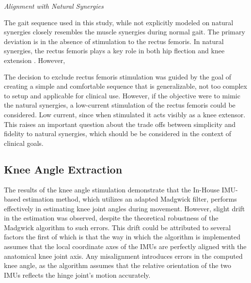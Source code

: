 \textit{Alignment with Natural Synergies}

The gait sequence used in this study, while not explicitly modeled on natural synergies closely resembles the muscle synergies during normal gait. The primary deviation is in the absence of stimulation to the rectus femoris. In natural synergies, the rectus femoris plays a key role in both hip flection and knee extension . However, 

The decision to exclude rectus femoris stimulation was guided by the goal of creating a simple and comfortable sequence that is generalizable, not too complex to setup and applicable for clinical use. However, if the objective were to mimic the natural synergies, a low-current stimulation of the rectus femoris could be considered. Low current, since when stimulated it acts visibly as a knee extensor. This raises an important question about the trade offs between simplicity and fidelity to natural synergies, which should be be considered in the context of clinical goals.

\subsection{Knee Angle Extraction}

The results of the knee angle stimulation demonstrate that the In-House IMU-based estimation method, which utilizes an adapted Madgwick filter, performs effectively in estimating knee joint angles during movement. However, slight drift in the estimation was observed, despite the theoretical robustness of the Madgwick algorithm to such errors. This drift could be attributed to several factors the first of which is that the way in which the algorithm is implemented assumes that the local coordinate axes of the IMUs are perfectly aligned with the anatomical knee joint axis. Any misalignment introduces errors in the computed knee angle, as the algorithm assumes that the relative orientation of the two IMUs reflects the hinge joint's motion accurately.

